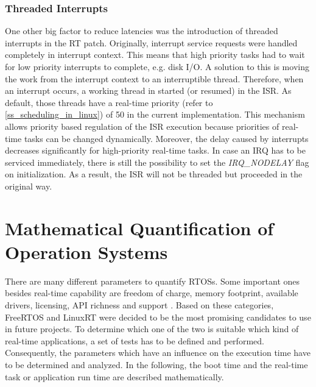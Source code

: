 \subsubsection{Threaded Interrupts}\label{ss_threaded_interrupts}
One other big factor to reduce latencies was the introduction of threaded interrupts in the RT patch.
Originally, interrupt service requests were handled completely in interrupt context.
This means that high priority tasks had to wait for low priority interrupts to complete, e.g. disk \ac{I/O}.
A solution to this is moving the work from the interrupt context to an interruptible thread.
Therefore, when an interrupt occurs, a working thread in started (or resumed) in the \ac{ISR}.
As default, those threads have a real-time priority (refer to \ref{ss_scheduling_in_linux}) of 50 in the current implementation.
This mechanism allows priority based regulation of the \ac{ISR} execution because priorities of real-time tasks can be changed dynamically. 
Moreover, the delay caused by interrupts decreases significantly for high-priority real-time tasks.
In case an \ac{IRQ} has to be serviced immediately, there is still the possibility to set the \textit{IRQ\_NODELAY} flag on initialization.
As a result, the \ac{ISR} will not be threaded but proceeded in the original way.

\section{Mathematical Quantification of Operation Systems}
There are many different parameters to quantify \acp{RTOS}.
Some important ones besides real-time capability are freedom of charge, memory footprint, available drivers, licensing, \ac{API} richness and support \cite{Anh:sapeortosfsm}.   
Based on these categories, FreeRTOS and LinuxRT were decided to be the most promising candidates to use in future projects.
To determine which one of the two is suitable which kind of real-time applications, a set of tests has to be defined and performed.
Consequently, the parameters which have an influence on the execution time have to be determined and analyzed.
In the following, the boot time and the real-time task or application run time are described mathematically.

